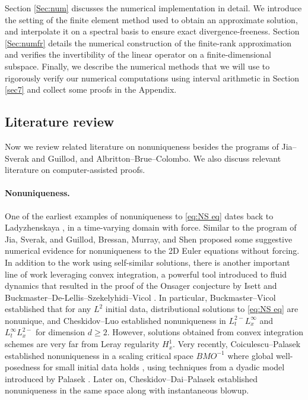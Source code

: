 \documentclass[11pt,a4paper]{article}
\numberwithin{equation}{section}
\begin{document}
Section \ref{Sec:num} discusses the numerical implementation in detail. We
introduce the setting of the finite element method used to obtain an approximate solution, and interpolate it on a spectral basis
to ensure exact divergence-freeness. Section \ref{Sec:numfr} details the numerical construction of the finite-rank approximation and verifies the invertibility of the
linear operator on a finite-dimensional subspace. Finally, we describe the numerical methods that we will use to rigorously verify our numerical computations using interval arithmetic in Section \ref{sec7} and collect some proofs in the Appendix.
\subsection{Literature review} Now we review related literature on nonuniqueness besides the programs of Jia--Sverak and Guillod, and Albritton--Brue--Colombo. We also discuss relevant literature on computer-assisted proofs.
\paragraph{Nonuniqueness.}
One of the earliest examples of nonuniqueness to \eqref{eq:NS eq} dates back to  Ladyzhenskaya \cite{ladyzhenskaya1969example}, in a time-varying domain with force. Similar to the program of Jia, Sverak, and Guillod, Bressan, Murray, and Shen \cite{bressan2021posteriori, bressan2020self} proposed some suggestive numerical evidence for nonuniqueness to the 2D Euler equations without forcing.  In addition to the work using self-similar solutions, there is another important line of work leveraging 
 convex integration, a powerful tool introduced to fluid dynamics that resulted in the proof of the Onsager conjecture by Isett \cite{isett2018proof} and  Buckmaster--De-Lellis--Szekelyhidi--Vicol \cite{ buckmaster2019onsager}. In particular, Buckmaster--Vicol \cite{buckmaster2019nonuniqueness} established that for any $L^2$ initial data, distributional solutions to \eqref{eq:NS eq} are nonunique, and Cheskidov--Luo  \cite{cheskidov2022sharp, cheskidov20232} established nonuniqueness in $ L_t^{2-}L_x^\infty$ and $ L_t^\infty L_x^{2-}$ for dimension $d\geqslant 2$. However, solutions obtained from convex integration schemes are very far from Leray regularity $H^1_x$. Very recently, Coiculescu--Palasek established nonuniqueness in a scaling critical space $BMO^{-1}$ \cite{coiculescu2025non} where global well-posedness for small initial data holds \cite{koch2001well}, using techniques from a dyadic model introduced by Palasek \cite{palasek2024non}. Later on, Cheskidov--Dai--Palasek \cite{cheskidov2025instantaneous} established nonuniqueness in the same space along with instantaneous blowup. 
\end{document}
